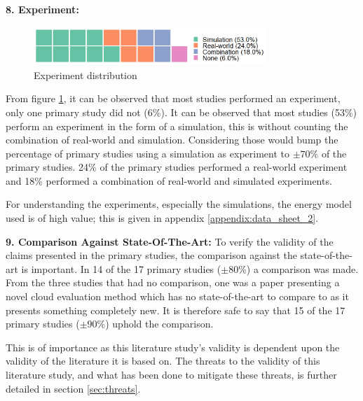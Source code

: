 \vspace{5mm}

\noindent\textbf{8. Experiment:}
\begin{figure}
    \includegraphics[width=250pt]{figures/waffle_exp_freq.png}
    \caption{Experiment distribution}
    \label{fig:experiment_distr}
\end{figure}
From figure \ref{fig:experiment_distr}, it can be observed that most studies performed an experiment, only one primary study did not (6\%).
It can be observed that most studies (53\%) perform an experiment in the form of a simulation, 
this is without counting the combination of real-world and simulation.
Considering those would bump the percentage of primary studies using a simulation as experiment to $\pm 70\%$ of the primary studies.
24\% of the primary studies performed a real-world experiment and 18\% performed a combination of real-world and simulated experiments.

\vspace{2mm}

For understanding the experiments, especially the simulations, the energy model used is of high value; this is given in appendix \ref{appendix:data_sheet_2}.

\vspace{5mm}

\noindent\textbf{9. Comparison Against State-Of-The-Art:}
To verify the validity of the claims presented in the primary studies, the comparison against the state-of-the-art is important.
In 14 of the 17 primary studies ($\pm 80\%$) a comparison was made.
From the three studies that had no comparison, one was a paper presenting a novel cloud evaluation method \cite{hou2017novel_cloud_evaluation_model}
which has no state-of-the-art to compare to as it presents something completely new. 
It is therefore safe to say that 15 of the 17 primary studies ($\pm 90\%$) uphold the comparison.

\vspace{2mm}

\noindent This is of importance as this literature study's validity is dependent upon the validity of the literature it is based on.
The threats to the validity of this literature study, and what has been done to mitigate these threats,
is further detailed in section \ref{sec:threats}.

